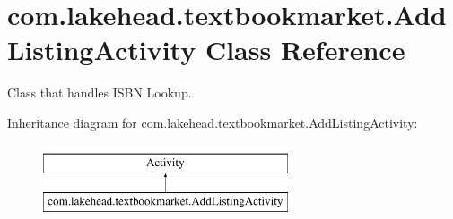 \hypertarget{classcom_1_1lakehead_1_1textbookmarket_1_1_add_listing_activity}{\section{com.\-lakehead.\-textbookmarket.\-Add\-Listing\-Activity Class Reference}
\label{classcom_1_1lakehead_1_1textbookmarket_1_1_add_listing_activity}
}


Class that handles I\-S\-B\-N Lookup.  


Inheritance diagram for com.\-lakehead.\-textbookmarket.\-Add\-Listing\-Activity\-:\begin{figure}[H]
\begin{center}
\leavevmode
\includegraphics[height=2.000000cm]{classcom_1_1lakehead_1_1textbookmarket_1_1_add_listing_activity}
\end{center}
\end{figure}
